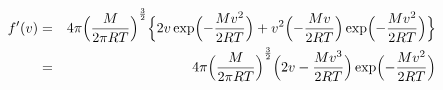 \begin{eqnarray*}
f'(v) &=& 4\pi {
    \Bigl(
        \frac{M}{2\pi RT}
    \Bigr) 
}^\frac{3}{2} 
    \Bigl\{ 
        2v \exp 
        \Bigl( 
          - \frac{Mv^{2}}{2RT} 
        \Bigr) + v^2 
        \Bigl( 
          - \frac{Mv}{2RT} 
        \Bigr) 
        \exp 
        \Bigl( 
          - \frac{Mv^{2}}{2RT} 
        \Bigr) 
    \Bigr\} \\
&=& 4\pi {
    \Bigl(
        \frac{M}{2\pi RT}
    \Bigr) 
}^\frac{3}{2} 
    \Bigl( 
        2v - \frac{Mv^{3}}{2RT}
    \Bigr)
\exp 
    \Bigl( 
        - \frac{Mv^{2}}{2RT} 
    \Bigr) 
\label{}
\end{eqnarray*}